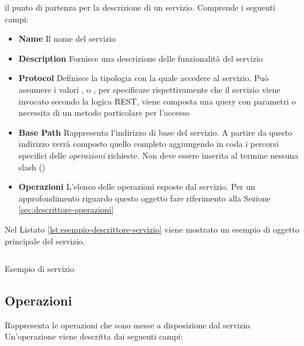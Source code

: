 \upe il punto di partenza per la descrizione di un servizio. Comprende i seguenti campi:

\begin{itemize}
	\item \textbf{Name} Il nome del servizio
	\item \textbf{Description} Fornisce una descrizione delle funzionalità del servizio
	\item \textbf{Protocol} Definisce la tipologia con la quale accedere al servizio. Può assumere i valori ,  o , per specificare rispettivamente che il servizio viene invocato secondo la logica REST, viene composta una query con parametri o necessita di un metodo particolare per l'accesso
	\item \textbf{Base Path} Rappresenta l'indirizzo di base del servizio. A partire da questo indirizzo verrà composto quello completo aggiungendo in coda i percorsi specifici delle \emph{operazioni} richieste. Non deve essere inserita al termine nessuna slash (\virgolette{/})
	\item \textbf{Operazioni} L'elenco delle operazioni esposte dal servizio. Per un approfondimento riguardo questo oggetto fare riferimento alla Sezione \ref{sec:descrittore-operazioni}
\end{itemize}

Nel Listato \ref{lst:esempio-descrittore-servizio} viene mostrato un esempio di oggetto principale del servizio.

\begin{listing}[H]
	\inputminted{json}{5-implementazione-backend/Codice/esempio_descrittore_servizio.json}
	\caption{Esempio di servizio}
	\label{lst:esempio-descrittore-servizio}
\end{listing}

\subsection{Operazioni\label{sec:descrittore-operazioni}}

Rappresenta le operazioni che sono messe a disposizione dal servizio. Un'operazione viene descritta dai seguenti campi:

